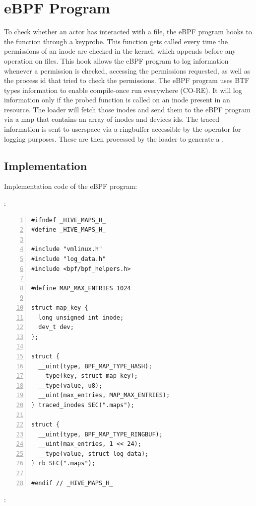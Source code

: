 \section{eBPF Program}

To check whether an actor has interacted with a file, the eBPF program hooks to
the function  through a keyprobe. This function gets
called every time the permissions of an inode are checked in the kernel, which
appends before any operation on files. This hook allows the eBPF program to log
information whenever a permission is checked, accessing the permissions
requested, as well as the process id that tried to check the permissions. The
eBPF program uses BTF types information to enable compile-once run everywhere
(CO-RE). It will log information only if the probed function is called on an
inode present in an  resource. The loader will fetch those inodes
and send them to the eBPF program via a map that contains an array of inodes and
devices ids. The traced information is sent to userspace via a ringbuffer
accessible by the operator for logging purposes. These are then processed by the
loader to generate a .

\subsection{Implementation}

Implementation code of the eBPF program:

:

\begin{Verbatim}[numbers=left, numbersep=5pt, frame=single]
#ifndef _HIVE_MAPS_H_
#define _HIVE_MAPS_H_

#include "vmlinux.h"
#include "log_data.h"
#include <bpf/bpf_helpers.h>

#define MAP_MAX_ENTRIES 1024

struct map_key {
  long unsigned int inode;
  dev_t dev;
};

struct {
  __uint(type, BPF_MAP_TYPE_HASH);
  __type(key, struct map_key);
  __type(value, u8);
  __uint(max_entries, MAP_MAX_ENTRIES);
} traced_inodes SEC(".maps");

struct {
  __uint(type, BPF_MAP_TYPE_RINGBUF);
  __uint(max_entries, 1 << 24);
  __type(value, struct log_data);
} rb SEC(".maps");

#endif // _HIVE_MAPS_H_
\end{Verbatim}

:

